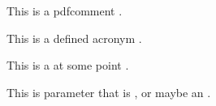 \documentclass[letterpaper,makeoneptfivespace]{KNEADdocument}
\begin{document}

This is a pdfcomment .

This is a \KNEAD defined acronym .

This is a \TBD at some point .

This is \TBS parameter that is \OBE, or maybe an \SSN.


\KNEADPrintTheIndexHere
 
\end{document}
